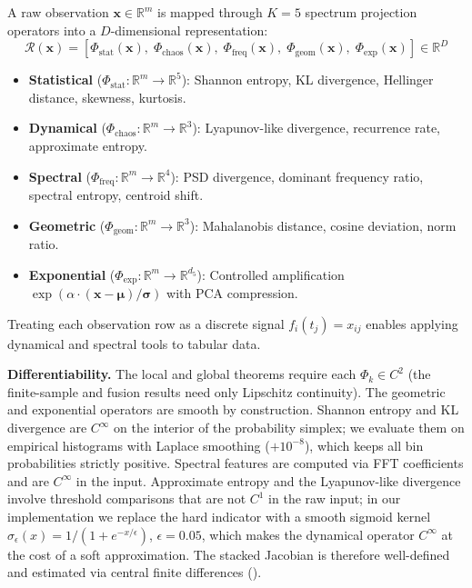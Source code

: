 \documentclass{article}
\newcommand{\R}{\mathbb{R}}
\newcommand{\calR}{\mathcal{R}}
\begin{document}
A raw observation $\mathbf{x} \in \R^m$ is mapped through $K=5$ spectrum projection operators into a $D$-dimensional representation:
\begin{equation}
\calR(\mathbf{x}) = \left[\Phi_{\text{stat}}(\mathbf{x}),\; \Phi_{\text{chaos}}(\mathbf{x}),\; \Phi_{\text{freq}}(\mathbf{x}),\; \Phi_{\text{geom}}(\mathbf{x}),\; \Phi_{\text{exp}}(\mathbf{x})\right] \in \R^D
\label{eq:stack}
\end{equation}

\begin{itemize}[leftmargin=*]
    \item \textbf{Statistical} ($\Phi_{\text{stat}}: \R^m \to \R^5$): Shannon entropy, KL divergence, Hellinger distance, skewness, kurtosis.
    \item \textbf{Dynamical} ($\Phi_{\text{chaos}}: \R^m \to \R^3$): Lyapunov-like divergence, recurrence rate, approximate entropy.
    \item \textbf{Spectral} ($\Phi_{\text{freq}}: \R^m \to \R^4$): PSD divergence, dominant frequency ratio, spectral entropy, centroid shift.
    \item \textbf{Geometric} ($\Phi_{\text{geom}}: \R^m \to \R^3$): Mahalanobis distance, cosine deviation, norm ratio.
    \item \textbf{Exponential} ($\Phi_{\text{exp}}: \R^m \to \R^{d_5}$): Controlled amplification $\exp(\alpha \cdot (\mathbf{x}-\bm{\mu})/\bm{\sigma})$ with PCA compression.
\end{itemize}

Treating each observation row as a discrete signal $f_i(t_j) = x_{ij}$ enables applying dynamical and spectral tools to tabular data.

\textbf{Differentiability.} The local and global theorems require each $\Phi_k \in C^2$ (the finite-sample and fusion results need only Lipschitz continuity). The geometric and exponential operators are smooth by construction. Shannon entropy and KL divergence are $C^\infty$ on the interior of the probability simplex; we evaluate them on empirical histograms with Laplace smoothing ($+10^{-8}$), which keeps all bin probabilities strictly positive. Spectral features are computed via FFT coefficients and are $C^\infty$ in the input. Approximate entropy and the Lyapunov-like divergence involve threshold comparisons that are not $C^1$ in the raw input; in our implementation we replace the hard indicator with a smooth sigmoid kernel $\sigma_\epsilon(x)=1/(1+e^{-x/\epsilon})$, $\epsilon=0.05$, which makes the dynamical operator $C^\infty$ at the cost of a soft approximation. The stacked Jacobian is therefore well-defined and estimated via central finite differences ().
\end{document}
